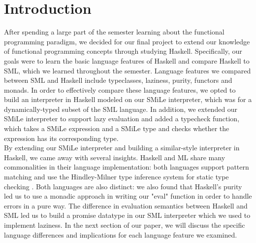 \documentclass[journal]{IEEEtran}
\begin{document}




\maketitle

%
\IEEEpeerreviewmaketitle



\section{Introduction}

After spending a large part of the semester learning about the functional programming paradigm, we decided for our final project to extend our knowledge of functional programming concepts through studying Haskell. Specifically, our goals were to learn the basic language features of Haskell and compare Haskell to SML, which we learned throughout the semester. Language features we compared between SML and Haskell include typeclasses, laziness, purity, functors and monads. In order to effectively compare these language features, we opted to build an interpreter in Haskell modeled on our SMiLe interpreter, which was for a dynamically-typed subset of the SML language. In addition, we extended our SMiLe interpreter to support lazy evaluation and added a typecheck function, which takes a  SMiLe expression and a SMiLe type and checks whether the expression has its corresponding type. \\

By extending our SMiLe interpreter and building a similar-style interpreter in Haskell, we came away with several insights. Haskell and ML share many commonalities in their language implementation: both languages support pattern matching and  use the Hindley-Milner type inference system for static type checking . Both languages are also distinct: we also found that Haskell's purity led us to use a monadic approach in writing our "eval" function in order to handle errors in a pure way. The difference in evaluation semantics between Haskell and SML led us to build a promise datatype in our SML interpreter which we used to implement laziness. In the next section of our paper, we will discuss the specific language differences and implications for each language feature we examined. 
\end{document}
